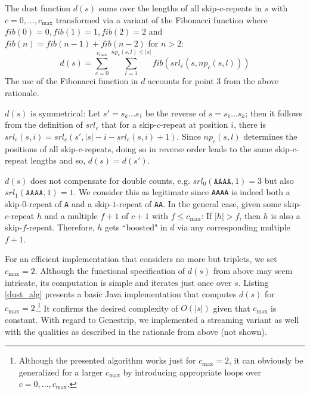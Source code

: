 \documentclass[pdflatex,sn-vancouver-num]{sn-jnl}
\begin{document}


The dust function $d(s)$ sums over the lengths of all skip-$c$-repeats in $s$ with $c = 0,\ldots, c_{\max}$ transformed via a variant of the Fibonacci function \citep{oeisA000045} where $fib(0) = 0, fib(1) = 1, fib(2) = 2$ and $fib(n) = fib(n - 1) + fib(n - 2)$ for $n > 2$:
\[d(s) = \sum_{c = 0}^{c_{\max}}  \sum_{l=1}^{np_c(s, l) \leq |s|} fib(srl_c(s,  np_c(s, l))) \]
The use of the Fibonacci function in $d$ accounts for point 3 from the above rationale.

 $d(s)$ is symmetrical: Let $s'=s_k \ldots s_1$ be the reverse of $s=s_1\ldots s_k$; then it follows from the definition of $srl_c$ that for a skip-$c$-repeat at position $i$, there is $srl_c(s, i) = srl_c(s', |s| - i - srl_c(s, i) + 1)$. Since $np_c(s, l)$ determines the positions of all skip-$c$-repeats, doing so in reverse order leads to the same skip-$c$-repeat lengths and so, $d(s) = d(s')$.

 
 $d(s)$ does not compensate for double counts, e.g. $srl_0(\texttt{AAAA}, 1) = 3$ but also $srl_1(\texttt{AAAA}, 1) = 1$. We consider this as legitimate since \texttt{AAAA} is indeed both a skip-$0$-repeat of \texttt{A} and a skip-$1$-repeat of \texttt{AA}. In the general case, given some skip-$c$-repeat $h$ and a multiple $f + 1$ of $c + 1$ with $f \leq c_{\max}$: If $|h| > f$, then $h$ is also a skip-$f$-repeat. Therefore, $h$ gets ``boosted" in $d$ via any corresponding multiple $f + 1$.
 
 For an efficient implementation that considers no more but triplets, we set $c_{\max} = 2$.
 Although the functional specification of $d(s)$ from above may seem intricate, its computation is simple and iterates just once over $s$. Listing \ref{dust_alg} presents a basic Java implementation that computes $d(s)$ for $c_{\max} = 2$.\footnote{Although the presented algorithm works just for $c_{\max} = 2$, it can obviously be generalized for a larger $c_{\max}$ by introducing appropriate loops over $c = 0,\ldots,c_{\max}$.} It confirms the desired complexity of $O(|s|)$ given that $c_{\max}$ is constant.
 With regard to Genestrip, we implemented a streaming variant as well with the qualities as described in the rationale from above (not shown).
\end{document}
